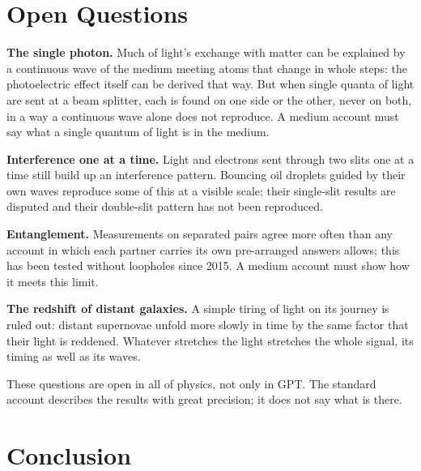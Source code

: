 \documentclass[11pt,a4paper]{article}
\begin{document}
\section{Open Questions}

\begin{openbar}
\textbf{The single photon.} Much of light's exchange with matter can be explained by a continuous wave of the medium meeting atoms that change in whole steps: the photoelectric effect itself can be derived that way.\footnotemark{} But when single quanta of light are sent at a beam splitter, each is found on one side or the other, never on both, in a way a continuous wave alone does not reproduce.\footnotemark{} A medium account must say what a single quantum of light is in the medium.

\textbf{Interference one at a time.} Light and electrons sent through two slits one at a time still build up an interference pattern. Bouncing oil droplets guided by their own waves reproduce some of this at a visible scale; their single-slit results are disputed and their double-slit pattern has not been reproduced.\footnotemark{}

\textbf{Entanglement.} Measurements on separated pairs agree more often than any account in which each partner carries its own pre-arranged answers allows; this has been tested without loopholes since 2015.\footnotemark{} A medium account must show how it meets this limit.

\textbf{The redshift of distant galaxies.} A simple tiring of light on its journey is ruled out: distant supernovae unfold more slowly in time by the same factor that their light is reddened.\footnotemark{} Whatever stretches the light stretches the whole signal, its timing as well as its waves.
\end{openbar}
\addtocounter{footnote}{-4}

These questions are open in all of physics, not only in GPT. The standard account describes the results with great precision; it does not say what is there.

\section*{Conclusion}
\end{document}
